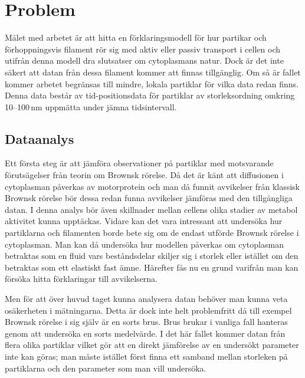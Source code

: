 
\section{Problem}

Målet med arbetet är att hitta en förklaringsmodell för hur partikar och förhoppningsvis filament rör sig med aktiv eller passiv transport i cellen och utifrån denna modell dra slutsatser om cytoplasmans natur. Dock är det inte säkert att datan från dessa filament kommer att finnas tillgänglig. Om så är fallet kommer arbetet begränsas till mindre, lokala partiklar för vilka data redan finns. Denna data består av tid-positionsdata för partiklar av storleksordning omkring 10--100\,nm uppmätta under jämna tidsintervall. %

\subsection{Dataanalys}

Ett första steg är att jämföra observationer på partiklar med motsvarande förutsägelser från teorin om Brownsk rörelse. Då det är känt att diffusionen i cytoplasman påverkas av motorprotein och man då funnit avvikelser\cite{Gou_etal2014} från klassisk Brownsk rörelse bör dessa redan funna avvikelser jämföras med den tillgängliga datan. I denna analys bör även skillnader mellan cellens olika stadier av metabol aktivitet kunna upptäckas. Vidare kan det vara intressant att undersöka hur partiklarna och filamenten borde bete sig om de endast utförde Brownsk rörelse i cytoplasman. Man kan då undersöka hur modellen påverkas om cytoplasman betraktas som en fluid vars beståndsdelar skiljer sig i storlek eller istället om den betraktas som ett elastiskt fast ämne. 
Härefter fås nu en grund varifrån man kan försöka hitta förklaringar till avvikelserna.

Men för att över huvud taget kunna analysera datan behöver man kunna veta osäkerheten i mätningarna. Detta är dock inte helt problemfritt då till exempel Brownsk rörelse i sig själv är en sorts brus. Brus brukar i vanliga fall hanteras genom att undersöka en sorts medelvärde. I det här fallet kommer datan från flera olika partiklar vilket gör att en direkt jämförelse av en undersökt parameter inte kan göras; man måste istället först finna ett samband mellan storleken på partiklarna och den parameter som man vill undersöka. 

